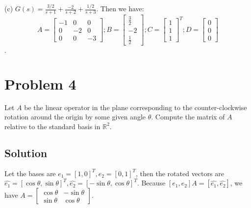 \documentclass[11pt]{report}
\theoremstyle{definition}
\begin{document}
\noindent(c) $G(s) = \frac{3/2}{s+1} + \frac{-2}{s+2} + \frac{1/2}{s+3}$. Then we have:
$$A = \begin{bmatrix}-1 & 0 & 0\\0 & -2 & 0\\0 & 0 & -3\end{bmatrix}; B = \begin{bmatrix}\frac{3}{2}\\-2\\\frac{1}{2}\end{bmatrix}; C = \begin{bmatrix}1\\1\\1\end{bmatrix}^T; D = \begin{bmatrix}0\\0\\0\end{bmatrix}$$.


\section*{Problem 4}
Let $A$ be the linear operator in the plane corresponding to the counter-clockwise rotation around the origin by some given angle $\theta$. Compute the matrix of $A$ relative to the standard basis in $\mathbb{R}^2$.



\subsection*{Solution}

Let the bases are $e_1=[1,0]^T, e_2=[0,1]^T$, then the rotated vectors are $\hat{e_1} = [\cos\theta, \sin\theta]^T, \hat{e_2} = [-\sin\theta, \cos\theta]^T$. Because $[e_1, e_2]A = [\hat{e_1}, \hat{e_2}]$, we have $A = \begin{bmatrix}\cos\theta&-\sin\theta\\\sin\theta&\cos\theta\end{bmatrix}$.
\end{document}
